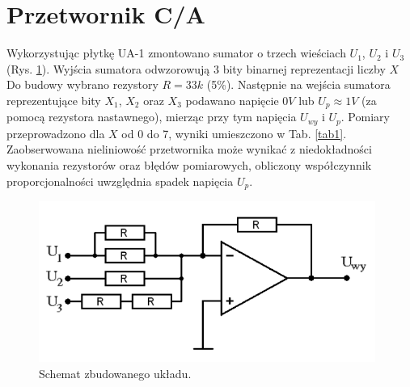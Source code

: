 \section{Przetwornik C/A}
Wykorzystując płytkę UA-1 zmontowano sumator o trzech wieściach \(U_1\), \(U_2\) i \(U_3\) (Rys. \ref{sh2}). Wyjścia sumatora odwzorowują 3 bity binarnej reprezentacji liczby \(X\)
Do budowy wybrano rezystory \(R=33k\) (5\%).
Następnie na wejścia sumatora reprezentujące bity \(X_1\), \(X_2\) oraz \(X_3\) podawano napięcie \(0V\) lub \(U_p\approx1V\) (za pomocą rezystora nastawnego), mierząc przy tym napięcia \(U_{wy}\) i \(U_p\).
Pomiary przeprowadzono dla \(X\) od 0 do 7, wyniki umieszczono w Tab. \ref{tab1}.
Zaobserwowana nieliniowość przetwornika może wynikać z niedokładności wykonania rezystorów oraz błędów pomiarowych, obliczony współczynnik proporcjonalności uwzględnia spadek napięcia \(U_p\).

\begin{figure}[H]
	\centering
	\includegraphics[width=11cm]{include/2/1.png}
	\caption{Schemat zbudowanego układu.}
	\label{sh2}
\end{figure}


